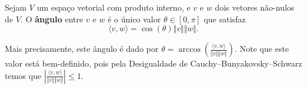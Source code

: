 \begin{definition}
	Sejam $V$ um espaço vetorial com produto interno, e $v$ e $w$ dois vetores não-nulos de $V$. O \textbf{ângulo} entre $v$ e $w$ é o único valor $\theta\in[0,\pi]$ que satisfaz
	\[\langle v,w\rangle=\cos(\theta)\Vert v\Vert\Vert w\Vert.\]
	
	Mais precisamente, este ângulo é dado por $\theta=\arccos\left(\frac{\langle v,w\rangle}{\Vert v\Vert\Vert w\Vert}\right)$. Note que este valor está bem-definido, pois pela Desigualdade de Cauchy–Bunyakovsky–Schwarz temos que $\left|\frac{\langle v,w\rangle}{\Vert v\Vert\Vert w\Vert}\right|\leq 1$.
\end{definition}